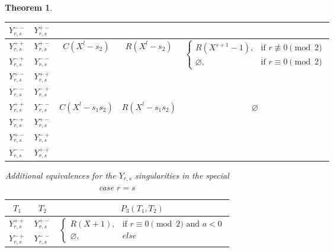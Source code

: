 \documentclass[noend]{amsproc}
\newtheorem{theorem}{Theorem}
\theoremstyle{definition}
\begin{document}
\begin{theorem}
\begin{table}[htb]
\begin{tabular}{|c|c||c|c|c|}
$Y_{r,s}^{--}$ & $Y_{r,s}^{+-}$ &&&
\\ \hline


$Y_{r,s}^{++}$ & $Y_{r,s}^{+-}$ &
\multirow{4}{*}{$C(X^l-s_2)$} &
\multirow{4}{*}{$R(X^l-s_2)$} &
\multirow{4}{*}{$\begin{cases}
  R(X^{s+1}-1), &\!\text{if } r \not\equiv 0 \pmod{2} \\
  \varnothing,  &\!\text{if } r \equiv 0 \pmod{2}
\end{cases}$}
\\ \cline{1-2}

$Y_{r,s}^{-+}$ & $Y_{r,s}^{--}$ &&&
\\ \cline{1-2}

$Y_{r,s}^{+-}$ & $Y_{r,s}^{++}$ &&&
\\ \cline{1-2}

$Y_{r,s}^{--}$ & $Y_{r,s}^{-+}$ &&&
\\ \hline


$Y_{r,s}^{++}$ & $Y_{r,s}^{--}$ &
\multirow{4}{*}{$C(X^l-s_1 s_2)$} &
\multirow{4}{*}{$R(X^l-s_1 s_2)$} &
\multirow{4}{*}{$\varnothing$}
\\ \cline{1-2}

$Y_{r,s}^{-+}$ & $Y_{r,s}^{+-}$ &&&
\\ \cline{1-2}

$Y_{r,s}^{+-}$ & $Y_{r,s}^{-+}$ &&&
\\ \cline{1-2}

$Y_{r,s}^{--}$ & $Y_{r,s}^{++}$ &&&
\\ \hline

\end{tabular}
\end{table}

\begin{table}[htb]
\centering
\caption{Additional equivalences for the $Y_{r,s}$ singularities in the
special case $r = s$}
\label{tab:Yrr_equivalences}
\begin{tabular}{|c|c||c|}
\hline

$T_1$ & $T_2$ & $P_3(T_1, T_2)$ \\
\hline\hline

$Y_{r,s}^{++}$ & $Y_{r,s}^{+-}$ &
\multirow{2}{*}{$\begin{cases}
  R(X+1),      &\!\text{if } r \equiv 0 \pmod{2} \text{ and } a < 0 \\
  \varnothing, &else
\end{cases}$}
\\ \cline{1-2}

$Y_{r,s}^{-+}$ & $Y_{r,s}^{--}$ &
\\ \hline


\end{tabular}
\end{table}
\end{theorem}
\end{document}
